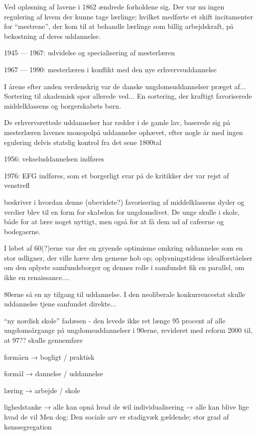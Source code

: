 Ved opløsning af lavene i 1862 ændrede forholdene sig.
Der var nu ingen regulering af hvem der kunne tage lærlinge; hvilket medførte et skift incitamenter for  “mestrene”, der kom til at behandle lærlinge som billig arbejdskraft, på bekostning af deres uddannelse.

1945 — 1967: udvidelse og specialisering af mesterlæren



1967 — 1990: mesterlæren i konflikt med den nye erhvervsuddannelse


I årene efter anden verdenskrig var de danske ungdomsuddannelser præget af...
Sortering til akademisk spor allerede ved... En sortering, der kraftigt favoriserede middelklassens og borgerskabets børn.

De erhvervsrettede uddannelser har rødder i de gamle lav, baserede sig på mesterlæren 
lavenes monopolpå uddannelse ophævet, efter nogle år med ingen egulering delvis statslig kontrol fra det sene  1800tal

1956: vekseluddannelsen indføres

1976: EFG indføres, som et borgerligt svar på de kritikker der var rejst af venstrefl

\citeauthor{juulDiskurserOmUngdom2013} beskriver i  hvordan denne (ubevidste?) favorisering af middelklassens dyder og verdier blev
til en form for skabelon for ungdomslivet.
De unge skulle i skole, både for at lære noget nyttigt, men også for at få dem ud af cafeerne og bodegaerne.


I løbet af 60(?)erne var der en gryende optimisme omkring uddannelse som en stor udligner, der ville hæve den gemene hob op; oplysningstidens idealforståelser om den oplyste samfundsborger og dennes rolle i samfundet fik en parallel, om ikke en renaissance....

80erne så en ny tilgang til uddannelse.
I den neoliberale konkurrencestat skulle uddannelse tjene sanfundet direkte...


“ny nordisk skole” fadæsen - den levede ikke ret længe
95 procent af alle ungdomsårgange på ungdomsuddannelser i 90erne, revideret med reform 2000 til, at 97?? skulle gennemføre

formåen → bogligt / praktisk

formål → dannelse / uddannelse

læring → arbejde / skole

lighedstanke  → alle kan opnå hvad de wil
individualisering → alle kan blive lige hvad de vil
Men dog: Den sociale arv er stadigvæk gældende; stor grad af kønssegregation



